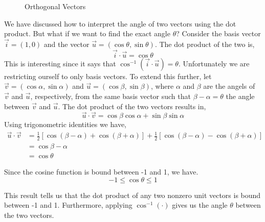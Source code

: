 \documentclass[12pt]{article}
\begin{document}
\begin{figure}[h!]
\centering
\caption{Orthogonal Vectors}
\label{fig:orgthogonalvectors}
\end{figure}

We have discussed how to interpret the angle of two vectors using the dot product. But what if we want to find the exact angle $\theta$? Consider the basis vector $\vec{i} = (1,0)$ and the vector $\vec{u}=(\cos{\theta}, \sin{\theta})$. The dot product of the two is,
\[
\vec{i}\cdot\vec{u} = \cos{\theta}
\]
This is interesting since it says that $\cos^{-1}(\vec{i}\cdot\vec{u})=\theta$. Unfortunately we are restricting ourself to only basis vectors. To extend this further, let $\vec{v}=(\cos{\alpha},\sin{\alpha})$ and $\vec{u}=(\cos{\beta},\sin{\beta})$, where $\alpha$ and $\beta$ are the angels of $\vec{v}$ and $\vec{u}$, respectively, from the same basis vector such that $\beta-\alpha=\theta$ the angle between $\vec{v}$ and $\vec{u}$. The dot product of the two vectors results in,
\[
\vec{u}\cdot\vec{v} = \cos{\beta}\cos{\alpha} + \sin{\beta}\sin{\alpha}
\] 
Using trigonometric identities we have,
\begin{align*}
\vec{u}\cdot\vec{v} &= \frac{1}{2}\left[ \cos{(\beta-\alpha)} + \cos{(\beta+\alpha)} \right]
+ \frac{1}{2}\left[ \cos{(\beta-\alpha)} - \cos{(\beta+\alpha)} \right] \\
&= \cos{\beta-\alpha} \\
&= \cos{\theta}
\end{align*}

Since the cosine function is bound between -1 and 1, we have.
\[
-1 \leq \cos{\theta} \leq 1
\]

This result tells us that the dot product of any two nonzero unit vectors is bound between -1 and 1. Furthermore, applying $\cos^{-1}(\cdot)$ gives us the angle $\theta$ between the two vectors. \\
\end{document}
